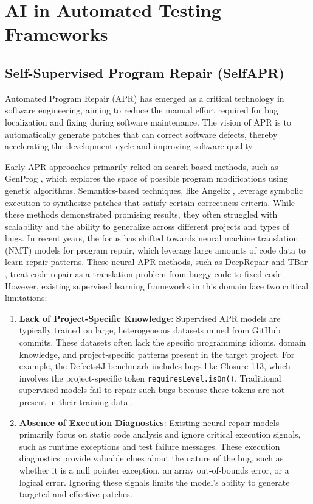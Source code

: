 \documentclass[manuscript,screen,review]{acmart}
\begin{document}
\section{AI in Automated Testing Frameworks}

\subsection{Self-Supervised Program Repair (SelfAPR)}

Automated Program Repair (APR) has emerged as a critical technology in software engineering, aiming to reduce the manual effort required for bug localization and fixing during software maintenance. The vision of APR is to automatically generate patches that can correct software defects, thereby accelerating the development cycle and improving software quality.

Early APR approaches primarily relied on search-based methods, such as GenProg \cite{genprog}, which explores the space of possible program modifications using genetic algorithms. Semantics-based techniques, like Angelix \cite{angelix}, leverage symbolic execution to synthesize patches that satisfy certain correctness criteria. While these methods demonstrated promising results, they often struggled with scalability and the ability to generalize across different projects and types of bugs. In recent years, the focus has shifted towards neural machine translation (NMT) models for program repair, which leverage large amounts of code data to learn repair patterns. These neural APR methods, such as DeepRepair \cite{deeprepair} and TBar \cite{tbar}, treat code repair as a translation problem from buggy code to fixed code. However, existing supervised learning frameworks in this domain face two critical limitations:

\begin{enumerate}
\item \textbf{Lack of Project-Specific Knowledge}: Supervised APR models are typically trained on large, heterogeneous datasets mined from GitHub commits. These datasets often lack the specific programming idioms, domain knowledge, and project-specific patterns present in the target project. For example, the Defects4J benchmark includes bugs like Closure-113, which involves the project-specific token \texttt{requiresLevel.isOn()}. Traditional supervised models fail to repair such bugs because these tokens are not present in their training data \cite{defects4j}.

\item \textbf{Absence of Execution Diagnostics}: Existing neural repair models primarily focus on static code analysis and ignore critical execution signals, such as runtime exceptions and test failure messages. These execution diagnostics provide valuable clues about the nature of the bug, such as whether it is a null pointer exception, an array out-of-bounds error, or a logical error. Ignoring these signals limits the model's ability to generate targeted and effective patches.
\end{enumerate}
\end{document}
